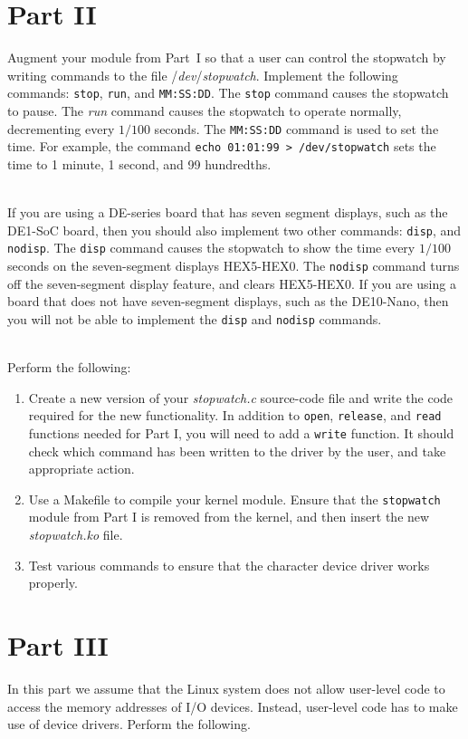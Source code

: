 \documentclass[epsfig,10pt,fullpage]{article}
\begin{document}
\section*{Part II}
\noindent
Augment your module from Part~I so that a user can control the stopwatch by writing
commands to the file /{\it dev}/{\it stopwatch}. Implement the following commands:
\texttt{stop}, \texttt{run}, and \texttt{MM:SS:DD}. The \texttt{stop} command causes the 
stopwatch to pause. The {\it run} command causes the stopwatch to operate normally, 
decrementing every $1/100$ seconds. The \texttt{MM:SS:DD} command is used to set the time.
For example, the command \texttt{echo 01:01:99 > /dev/stopwatch} sets the time to 1 
minute, 1 second, and 99 hundredths. 

~\\
\noindent
If you are using a DE-series board that has seven segment displays, such as the DE1-SoC
board, then you should also implement two other commands: \texttt{disp}, and \texttt{nodisp}. 
The \texttt{disp} command causes the stopwatch to show the time every $1/100$
seconds on the seven-segment displays HEX5-HEX0. The \texttt{nodisp} command turns off the
seven-segment display feature, and clears HEX5-HEX0. If you are using a board that does
not have seven-segment displays, such as the DE10-Nano, then you will not be able to
implement the \texttt{disp} and \texttt{nodisp} commands.

~\\
\noindent
Perform the following:

\begin{enumerate}
\item Create a new version of your {\it stopwatch.c} source-code file and write the code 
required for the new functionality. In addition to \texttt{open}, \texttt{release}, and 
\texttt{read} functions needed for Part I, you will need to add a \texttt{write} function. 
It should check which command has been written to the driver by the user, and take
appropriate action.

\item Use a Makefile to compile your kernel module. Ensure that the \texttt{stopwatch}
module from Part I is removed from the kernel, and then insert the new {\it stopwatch.ko} file. 

\item Test various commands to ensure that the character device driver works properly. 
\end{enumerate}

\section*{Part III}
\noindent
In this part we assume that the Linux system does not allow user-level code to access the
memory addresses of I/O devices. Instead, user-level code has to make use of device
drivers. Perform the following. 
\end{document}
